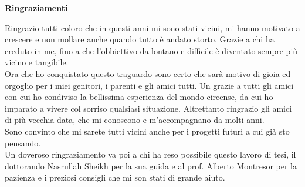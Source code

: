 \thispagestyle{empty}

\begin{center}
  {\bf \Huge Ringraziamenti}
\end{center}

\vspace{2cm}
\noindent Ringrazio tutti coloro che in questi anni mi sono stati vicini, mi hanno motivato a crescere e non mollare anche quando tutto è andato storto. Grazie a chi ha creduto in me, fino a che l'obbiettivo da lontano e difficile è diventato sempre più vicino e tangibile.\\
Ora che ho conquistato questo traguardo sono certo che sarà motivo di gioia ed orgoglio per i miei genitori, i parenti e gli amici tutti. Un grazie a tutti gli amici con cui ho condiviso la bellissima esperienza del mondo circense, da cui ho imparato a vivere col sorriso qualsiasi situazione. Altrettanto ringrazio gli amici di più vecchia data, che mi conoscono e m'accompagnano da molti anni.\\
Sono convinto che mi sarete tutti vicini anche per i progetti futuri a cui già sto pensando.\\
Un doveroso ringraziamento va poi a chi ha reso possibile questo lavoro di tesi, il dottorando Nasrullah Sheikh per la sua guida e al prof. Alberto Montresor per la pazienza e i preziosi consigli che mi son stati di grande aiuto.
